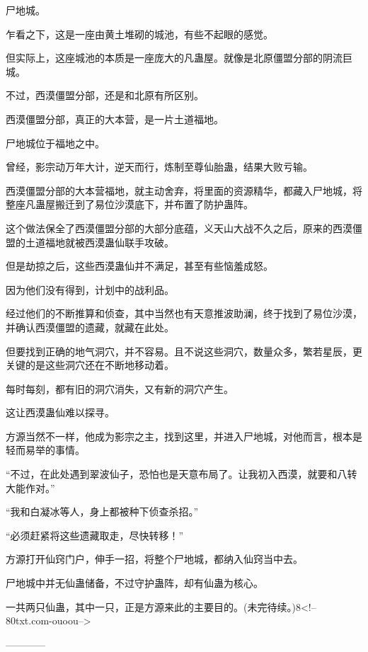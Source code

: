\begin{this_body}
尸地城。

乍看之下，这是一座由黄土堆砌的城池，有些不起眼的感觉。

但实际上，这座城池的本质是一座庞大的凡蛊屋。就像是北原僵盟分部的阴流巨城。

不过，西漠僵盟分部，还是和北原有所区别。

西漠僵盟分部，真正的大本营，是一片土道福地。

尸地城位于福地之中。

曾经，影宗动万年大计，逆天而行，炼制至尊仙胎蛊，结果大败亏输。

西漠僵盟分部的大本营福地，就主动舍弃，将里面的资源精华，都藏入尸地城，将整座凡蛊屋搬迁到了易位沙漠底下，并布置了防护蛊阵。

这个做法保全了西漠僵盟分部的大部分底蕴，义天山大战不久之后，原来的西漠僵盟的土道福地就被西漠蛊仙联手攻破。

但是劫掠之后，这些西漠蛊仙并不满足，甚至有些恼羞成怒。

因为他们没有得到，计划中的战利品。

经过他们的不断推算和侦查，其中当然也有天意推波助澜，终于找到了易位沙漠，并确认西漠僵盟的遗藏，就藏在此处。

但要找到正确的地气洞穴，并不容易。且不说这些洞穴，数量众多，繁若星辰，更关键的是这些洞穴还在不断地移动着。

每时每刻，都有旧的洞穴消失，又有新的洞穴产生。

这让西漠蛊仙难以探寻。

方源当然不一样，他成为影宗之主，找到这里，并进入尸地城，对他而言，根本是轻而易举的事情。

“不过，在此处遇到翠波仙子，恐怕也是天意布局了。让我初入西漠，就要和八转大能作对。”

“我和白凝冰等人，身上都被种下侦查杀招。”

“必须赶紧将这些遗藏取走，尽快转移！”

方源打开仙窍门户，伸手一招，将整个尸地城，都纳入仙窍当中去。

尸地城中并无仙蛊储备，不过守护蛊阵，却有仙蛊为核心。

一共两只仙蛊，其中一只，正是方源来此的主要目的。(未完待续。)8<!--80txt.com-ouoou-->

------------

\end{this_body}


